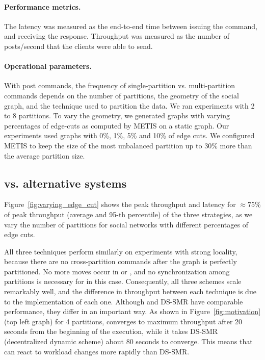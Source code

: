 \paragraph*{Performance metrics.}
%
The latency was measured as the end-to-end time between issuing the
command, and receiving the response.  Throughput was measured as the
number of posts/second that the clients were able to send.

\paragraph*{Operational parameters.}
%
With post commands, the frequency of single-partition
vs. multi-partition commands depends on the number of partitions, the
geometry of the social graph, and the technique used to partition the
data. We ran experiments with 2 to 8 partitions.  To vary the
geometry, we generated graphs with varying percentages of edge-cuts as
computed by METIS on a static graph. Our experiments used graphs with
0\%, 1\%, 5\% and 10\% of edge cuts. We configured METIS to keep the size of 
the most unbalanced partition up to 30\% more than the average partition size.


\subsection{\dynastar vs. alternative systems}
\label{sec:evaluation:results}

Figure~\ref{fig:varying_edge_cut} shows the peak throughput and latency for $\approx$75\% of peak throughput (average and 95-th percentile) of the three strategies, 
as we vary the number of partitions for social networks with different percentages of edge cuts.

All three techniques perform similarly on experiments with
strong locality, because there are no cross-partition commands after
the graph is perfectly partitioned. No more moves occur in
\dynastar or \dssmr, and no synchronization among partitions is
necessary for \ssmr in this case. 
Consequently, all three schemes scale remarkably well, and
the difference in throughput between each technique is due to the implementation of each one.
Although \dynastar and DS-SMR have comparable performance, they differ in an important way. 
As shown in Figure~\ref{fig:motivation} (top left graph) for 4 partitions, \dynastar converges 
to maximum throughput after 20 seconds from the beginning of the execution, while it takes 
DS-SMR (decentralized dynamic scheme) about 80 seconds to converge.
This means that \dynastar can react to workload changes more rapidly than DS-SMR.

